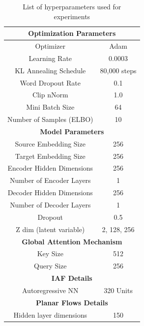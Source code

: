\begin{table}[]
	\caption{List of hyperparameters used for experiments }
	\label{tab:hyperparams}
	\center
	\begin{tabular}{|c|c|}
		\hline
		\multicolumn{2}{|c|}{\textbf{Optimization Parameters}} \\ \hline
		Optimizer                        & Adam                \\ \hline
		Learning Rate                    & 0.0003              \\ \hline
		KL Annealing Schedule            & 80,000 steps        \\ \hline
		Word Dropout Rate                & 0.1                 \\ \hline
		Clip nNorm                        & 1.0                 \\ \hline
		Mini Batch Size                  & 64                  \\ \hline
		Number of Samples (ELBO)         & 10                  \\ \hline
		\multicolumn{2}{|c|}{\textbf{Model Parameters}}                 \\ \hline
		Source Embedding Size            & 256                 \\ \hline
		Target Embedding Size            & 256                 \\ \hline
		Encoder Hidden Dimensions        & 256                 \\ \hline
		Number of Encoder Layers         & 1                   \\ \hline
		Decoder Hidden Dimensions        & 256                 \\ \hline
		Number of Decoder Layers         & 1                   \\ \hline
		Dropout                          & 0.5                 \\ \hline
		Z dim (latent variable)          & 2, 128, 256        \\ \hline
		\multicolumn{2}{|c|}{\textbf{Global Attention Mechanism}}       \\ \hline
		Key Size                         & 512                 \\ \hline
		Query Size                       & 256                 \\ \hline
		\multicolumn{2}{|c|}{\textbf{IAF Details}}                    \\ \hline
		Autoregressive NN                & 320 Units           \\ \hline
		\multicolumn{2}{|c|}{\textbf{Planar Flows Details}}             \\ \hline
		Hidden layer dimensions          & 150                 \\ \hline
	\end{tabular}
\end{table}



